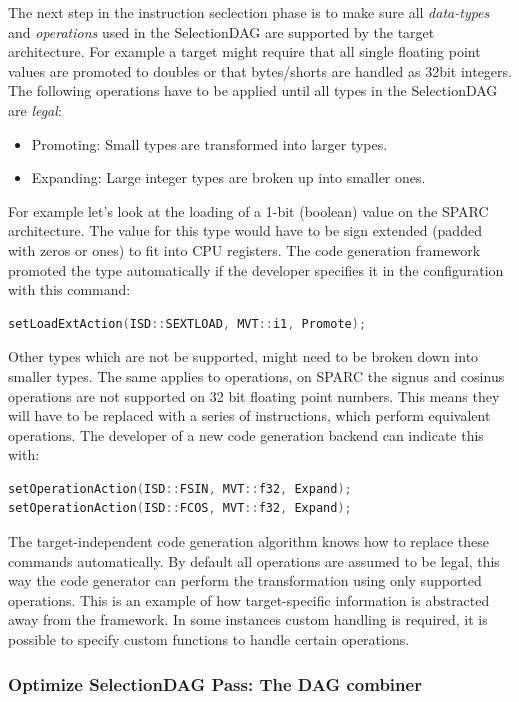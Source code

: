 The next step in the instruction seclection phase is to make sure all \textit{data-types} and \textit{operations} used in the SelectionDAG 
are supported by the target architecture. For example a target might require that all single floating point values 
are promoted to doubles or that bytes/shorts are handled as 32bit integers.
The following operations have to be applied until all types in the SelectionDAG are \textit{legal}:
\begin{itemize}
  \item Promoting: Small types are transformed into larger types.
  \item Expanding: Large integer types are broken up into smaller ones.
\end{itemize}

For example let's look at the loading of a 1-bit (boolean) value on the SPARC architecture. The value for this type would have to 
be sign extended (padded with zeros or ones) to fit into CPU registers. The code generation framework promoted the type automatically
if the developer specifies it in the configuration with this command:
\begin{lstlisting}[language=C++]
setLoadExtAction(ISD::SEXTLOAD, MVT::i1, Promote);
\end{lstlisting}

Other types which are not be supported, might need to be broken down into smaller types. The same applies to operations, on
SPARC the signus and cosinus operations are not supported on 32 bit floating point numbers.
This means they will have to be replaced with a series of instructions, which perform equivalent operations. The developer of
a new code generation backend can indicate this with: 
\begin{lstlisting}[language=C++]
setOperationAction(ISD::FSIN, MVT::f32, Expand);
setOperationAction(ISD::FCOS, MVT::f32, Expand);
\end{lstlisting}
The target-independent code generation algorithm knows how to replace these commands automatically. 
By default all operations are assumed to be legal, this way the code generator can perform the
transformation using only supported operations.
This is an example of how target-specific information is abstracted away from the framework. In some instances custom handling
is required, it is possible to specify custom functions to handle certain operations.  

\subsubsection{Optimize SelectionDAG Pass: The DAG combiner}

